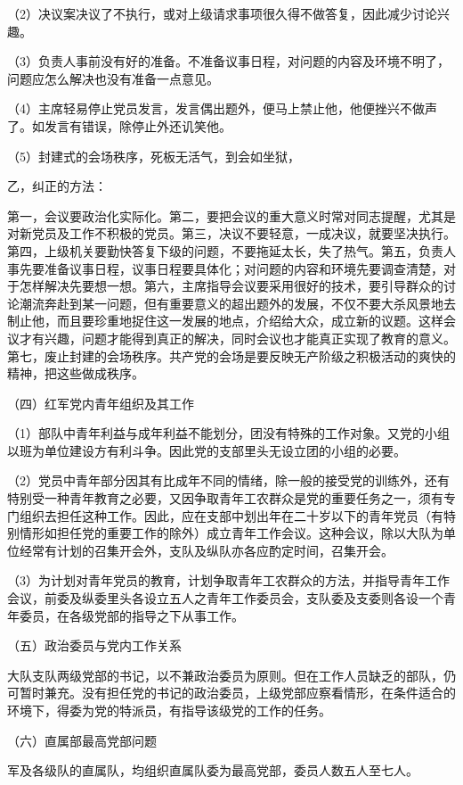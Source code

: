 （2）决议案决议了不执行，或对上级请求事项很久得不做答复，因此减少讨论兴趣。

（3）负责人事前没有好的准备。不准备议事日程，对问题的内容及环境不明了，问题应怎么解决也没有准备一点意见。

（4）主席轻易停止党员发言，发言偶出题外，便马上禁止他，他便挫兴不做声了。如发言有错误，除停止外还讥笑他。

（5）封建式的会场秩序，死板无活气，到会如坐狱，

乙，纠正的方法：

第一，会议要政治化实际化。第二，要把会议的重大意义时常对同志提醒，尤其是对新党员及工作不积极的党员。第三，决议不要轻意，一成决议，就要坚决执行。第四，上级机关要勤快答复下级的问题，不要拖延太长，失了热气。第五，负责人事先要准备议事日程，议事日程要具体化；对问题的内容和环境先要调查清楚，对于怎样解决先要想一想。第六，主席指导会议要采用很好的技术，要引导群众的讨论潮流奔赴到某一问题，但有重要意义的超出题外的发展，不仅不要大杀风景地去制止他，而且要珍重地捉住这一发展的地点，介绍给大众，成立新的议题。这样会议才有兴趣，问题才能得到真正的解决，同时会议也才能真正实现了教育的意义。第七，废止封建的会场秩序。共产党的会场是要反映无产阶级之积极活动的爽快的精神，把这些做成秩序。

（四）红军党内青年组织及其工作

（1）部队中青年利益与成年利益不能划分，团没有特殊的工作对象。又党的小组以班为单位建设方有利斗争。因此党的支部里头无设立团的小组的必要。

（2）党员中青年部分因其有比成年不同的情绪，除一般的接受党的训练外，还有特别受一种青年教育之必要，又因争取青年工农群众是党的重要任务之一，须有专门组织去担任这种工作。因此，应在支部中划出年在二十岁以下的青年党员（有特别情形如担任党的重要工作的除外）成立青年工作会议。这种会议，除以大队为单位经常有计划的召集开会外，支队及纵队亦各应酌定时间，召集开会。

（3）为计划对青年党员的教育，计划争取青年工农群众的方法，并指导青年工作会议，前委及纵委里头各设立五人之青年工作委员会，支队委及支委则各设一个青年委员，在各级党部的指导之下从事工作。

（五）政治委员与党内工作关系

大队支队两级党部的书记，以不兼政治委员为原则。但在工作人员缺乏的部队，仍可暂时兼充。没有担任党的书记的政治委员，上级党部应察看情形，在条件适合的环境下，得委为党的特派员，有指导该级党的工作的任务。

（六）直属部最高党部问题

军及各级队的直属队，均组织直属队委为最高党部，委员人数五人至七人。

